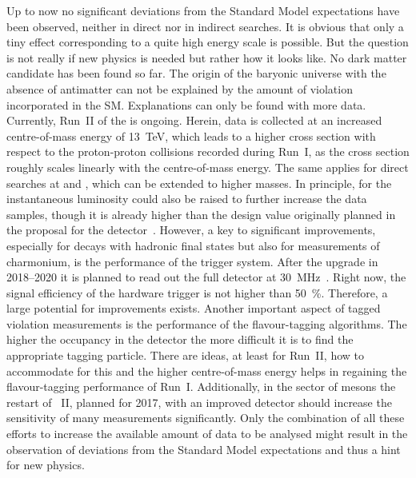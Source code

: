 Up to now no significant deviations from the Standard Model expectations have
been observed, neither in direct nor in indirect searches. It is obvious that
only a tiny effect corresponding to a quite high energy scale is possible. But
the question is not really if new physics is needed but rather how it looks
like. No dark matter candidate has been found so far. The origin of the
baryonic universe with the absence of antimatter can not be explained by the
amount of \CP violation incorporated in the SM. Explanations can only be found
with more data. Currently, Run~II of the \lhc is ongoing. Herein, data is
collected at an increased centre-of-mass energy of \SI{13}{\TeV}, which leads
to a higher \bbbar cross section with respect to the proton-proton collisions
recorded during Run~I, as the cross section roughly scales linearly with the
centre-of-mass energy. The same applies for direct searches at \atlas and
\cms, which can be extended to higher masses. In principle, for \lhcb the
instantaneous luminosity could also be raised to further increase the data
samples, though it is already higher than the design value originally planned
in the proposal for the detector~\cite{LHCb-Technical-Proposal}. However, a
key to significant improvements, especially for decays with hadronic final
states but also for measurements of charmonium, is the performance of the
trigger system. After the upgrade in 2018--2020 it is planned to read out the
full detector at \SI{30}{\mega\hertz}~\cite{LHCb-TDR-016}. Right now, the
signal efficiency of the hardware trigger is not higher than
\SI{50}{\percent}. Therefore, a large potential for improvements exists.
Another important aspect of tagged \CP violation measurements is the
performance of the flavour-tagging algorithms. The higher the occupancy in the
detector the more difficult it is to find the appropriate tagging particle.
There are ideas, at least for Run~II, how to accommodate for this and the
higher centre-of-mass energy helps in regaining the flavour-tagging
performance of Run~I. Additionally, in the sector of \Bz mesons the restart of
\belle~II, planned for 2017, with an improved detector should increase the
sensitivity of many measurements significantly. Only the combination of all
these efforts to increase the available amount of data to be analysed might
result in the observation of deviations from the Standard Model expectations
and thus a hint for new physics.

